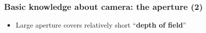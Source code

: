 \begin{frame}
 \frametitle{Basic knowledge about camera: the aperture (2)}
\begin{figure}
\begin{center}
	\hspace{0.15in}
\end{center}
\end{figure}
\begin{itemize}
	\item {Large aperture covers relatively short ``\textbf{depth of field}''}
\end{itemize}
\end{frame}